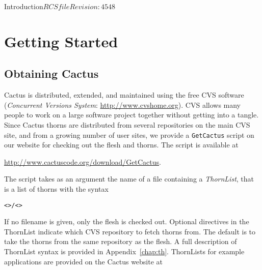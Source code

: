 
\begin{cactuspart}{Introduction}{$RCSfile$}{$Revision: 4548 $}\label{part:Introduction}
\renewcommand{\thepage}{\Alph{part}\arabic{page}}


\chapter{Getting Started}
\label{cha:gs}


\section{Obtaining Cactus}
\label{sec:checkout}

Cactus is distributed, extended, and maintained using the free CVS
software (\textit{Concurrent Versions System}: \url{http://www.cvshome.org}).
CVS  allows many people to work on a large software project
together without getting into a tangle.
Since Cactus thorns are distributed from several repositories on the
main CVS site, and from a growing number of user sites, we provide a
\texttt{GetCactus} script on our website for checking out the flesh 
and thorns. The script is available at

\url{http://www.cactuscode.org/download/GetCactus}.

The
script takes as an argument the name of a file containing a \textit{ThornList},
that is a list of thorns with the syntax
\begin{alltt}
<>/<>
\end{alltt}

If no filename is given, only the flesh is checked out.
Optional directives in the ThornList indicate which CVS repository to fetch
thorns from. The default is to take the thorns from the same repository as
the flesh. A full description of ThornList syntax is provided in Appendix~\ref{chap:th}.
ThornLists for example applications are provided on the Cactus website at


\end{cactuspart}
